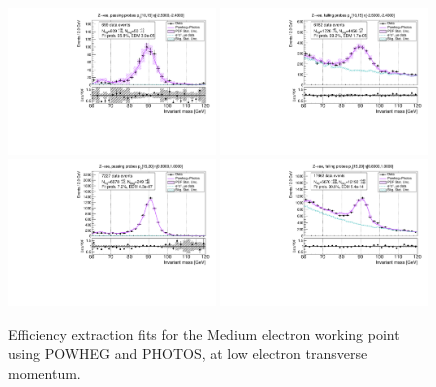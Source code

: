 {\begin{figure}
\includegraphics[width=0.49\textwidth]{figures/Zee_PowhegPhotos_BkgLPiEMu_pass_ptBin0_etaBin0.pdf}
\includegraphics[width=0.49\textwidth]{figures/Zee_PowhegPhotos_BkgLPiEMu_fail_ptBin0_etaBin0.pdf}
\includegraphics[width=0.49\textwidth]{figures/Zee_PowhegPhotos_BkgLPiEMu_pass_ptBin1_etaBin19.pdf}
\includegraphics[width=0.49\textwidth]{figures/Zee_PowhegPhotos_BkgLPiEMu_fail_ptBin1_etaBin19.pdf}
\caption{Efficiency extraction fits for the Medium electron working point using POWHEG and PHOTOS, at low electron transverse momentum.}
\label{fig:ZeeAltSigFSRFits3}
\end{figure}

}
